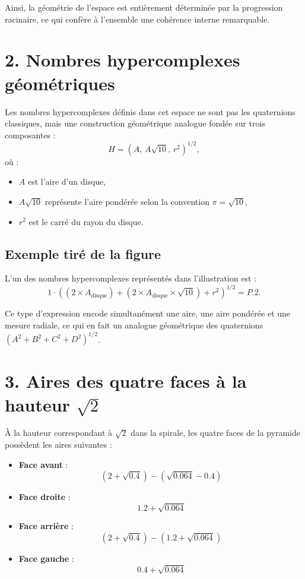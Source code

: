 \documentclass[12pt]{article}
\begin{document}
Ainsi, la géométrie de l’espace est entièrement déterminée par la progression racinaire, ce qui confère à l’ensemble une cohérence interne remarquable.

\section*{2. Nombres hypercomplexes géométriques}

Les nombres hypercomplexes définis dans cet espace ne sont pas les quaternions classiques, mais une construction géométrique analogue fondée sur trois composantes :
\[
H = \left( A,\, A\sqrt{10},\, r^2 \right)^{1/2},
\]
où :
\begin{itemize}
    \item $A$ est l’aire d’un disque,
    \item $A\sqrt{10}$ représente l’aire pondérée selon la convention $\pi=\sqrt{10}$,
    \item $r^2$ est le carré du rayon du disque.
\end{itemize}

\subsection*{Exemple tiré de la figure}

L’un des nombres hypercomplexes représentés dans l’illustration est :
\[
1 \cdot \left( (2 \times A_{\text{disque}}) + (2 \times A_{\text{disque}} \times \sqrt{10}) + r^2 \right)^{1/2} = P.2.
\]

Ce type d’expression encode simultanément une aire, une aire pondérée et une mesure radiale, ce qui en fait un analogue géométrique des quaternions $(A^2 + B^2 + C^2 + D^2)^{1/2}$.

\section*{3. Aires des quatre faces à la hauteur $\sqrt{2}$}

À la hauteur correspondant à $\sqrt{2}$ dans la spirale, les quatre faces de la pyramide possèdent les aires suivantes :

\begin{itemize}
    \item \textbf{Face avant} :
    \[
    (2 + \sqrt{0.4}) - (\sqrt{0.064} - 0.4)
    \]
    \item \textbf{Face droite} :
    \[
    1.2 + \sqrt{0.064}
    \]
    \item \textbf{Face arrière} :
    \[
    (2 + \sqrt{0.4}) - (1.2 + \sqrt{0.064})
    \]
    \item \textbf{Face gauche} :
    \[
    0.4 + \sqrt{0.064}
    \]
\end{itemize}
\end{document}

